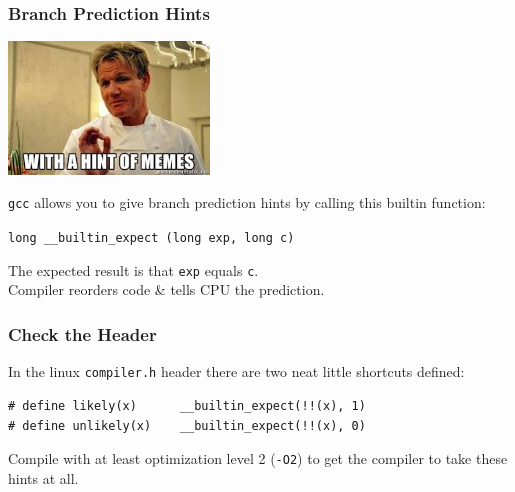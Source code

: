 \begin{frame}[fragile]
  \frametitle{Branch Prediction Hints}

\begin{center}
	\includegraphics[width=0.4\textwidth]{images/hint.jpeg}
\end{center}
  
  {\tt gcc} allows you to give branch
  prediction hints by calling this builtin function:

  \begin{center}
    \verb+long __builtin_expect (long exp, long c)+
  \end{center}

  The expected result is that {\tt exp} equals {\tt c}.\\[1em]
  Compiler reorders code \& tells CPU the prediction.
  
  
\end{frame}



\begin{frame}[fragile]
\frametitle{Check the Header}

In the linux \texttt{compiler.h} header there are two neat little shortcuts defined:

\begin{verbatim}
# define likely(x)      __builtin_expect(!!(x), 1)
# define unlikely(x)    __builtin_expect(!!(x), 0)
\end{verbatim}

Compile with at least optimization level 2 (\texttt{-O2}) to get the compiler to take these hints at all.

\end{frame}



